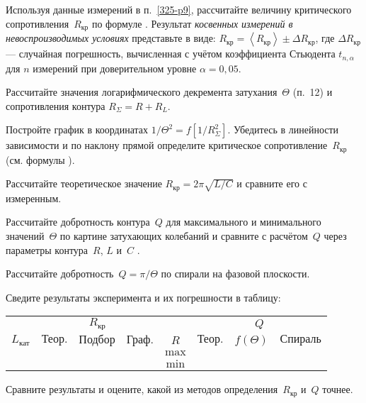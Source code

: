 \begin{lab:task}
\item 
Используя данные измерений в п.~\ref{325-p9}, рассчитайте величину критического 
сопротивления~$R_{кр}$ по формуле . Результат \emph{косвенных измерений в невоспроизводимых условиях} представьте в виде: $R_{кр}=\left<R_{кр}\right> \pm \Delta R_{кр}$, 
где $\Delta R_{кр}$ --- случайная погрешность, вычисленная с учётом коэффициента Стьюдента 
$t_{n,\alpha}$ для $n$ измерений при доверительном уровне $\alpha=0,05$.


\item Рассчитайте значения логарифмического декремента затухания~$\Theta$ (п.~12) 
и сопротивления контура $R_{\Sigma}=R+R_L$.

Постройте график в координатах $1/\Theta^2 =f[1/R^2_{\Sigma}]$. Убедитесь 
в линейности зависимости и по наклону прямой определите критическое 
сопротивление~$R_\text{кр}$ (см. формулы ). 

\item Рассчитайте теоретическое значение $R_\text{кр} = 2\pi\sqrt{L / C}$
и сравните его с измеренным.

\item Рассчитайте добротность контура~$Q$ для максимального и минимального
значений~$\Theta$ по картине затухающих колебаний и сравните с расчётом~$Q$
через параметры контура~$R$, $L$ и~$C$  .

\item Рассчитайте добротность~$Q=\pi/\Theta$ по спирали на фазовой плоскости.

\item Сведите результаты эксперимента и их погрешности в таблицу:
\begin{center}\small
\begin{tabular}{|c|c|c|c|c|c|c|c|}
\hline
& \multicolumn{3}{c|}{$R_{\text{кр}}$} &  & \multicolumn{3}{c|}{$Q$} \\
\cline{2-4}
\cline{6-8}
$L_{\text{кат}}$ & $\text{Теор.}$ & $\text{Подбор}$ & $\text{Граф.}$ & $R$ &
$\text{Теор.}$ & $f(\Theta)$ & $\text{Спираль}$  \\
\hline
& & & & $\text{max}$ & & &  \\
& & & & $\text{min}$ & & &  \\
\hline
\end{tabular}
\end{center}

\item Сравните результаты и оцените, какой из методов определения~$R_\text{кр}$ и~$Q$ 
точнее.

\end{lab:task}


